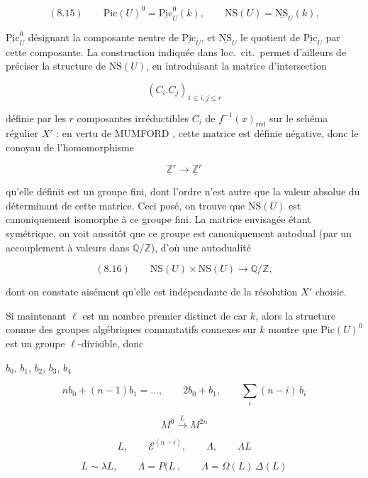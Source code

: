 \documentclass[11pt,a4paper]{article}
\begin{document}
\[ (8.15) \qquad \mathrm{Pic}(U)^{0} = \underline{\mathrm{Pic}}_{U}^{0}(k) , \qquad \mathrm{NS}(U) = \underline{\mathrm{NS}}_{U}(k) , \]

$\underline{\mathrm{Pic}}_{U}^{0}$ désignant la composante neutre de
$\underline{\mathrm{Pic}}_{U}$, et $\underline{\mathrm{NS}}_{U}$ le quotient de
$\underline{\mathrm{Pic}}_{U}$ par cette composante. La construction indiquée
dans loc.\ cit.\ permet d'ailleurs de préciser la structure de $\mathrm{NS}(U)$,
en introduisant la matrice d'intersection

\[ (C_{i} . C_{j})_{1 \leqslant i, j \leqslant r} \]

définie par les $r$ composantes irréductibles $C_{i}$ de $f^{-1}(x)_{\text{réd}}$
sur le schéma régulier $X'$ : en vertu de MUMFORD , cette matrice
est définie négative, donc le conoyau de l'homomorphisme

\[ \underline{\mathbb{Z}}^{r} \longrightarrow \underline{\mathbb{Z}}^{r} \]

qu'elle définit est un groupe fini, dont l'ordre n'est autre que la valeur
absolue du déterminant de cette matrice. Ceci posé, on trouve que
$\mathrm{NS}(U)$ est canoniquement isomorphe à ce groupe fini. La matrice
envisagée étant symétrique, on voit aussitôt que ce groupe est canoniquement
autodual (par un accouplement  à valeurs dans
$\mathbb{Q}/\mathbb{Z}$), d'où une autodualité 

\[ (8.16) \qquad \mathrm{NS}(U) \times \mathrm{NS}(U) \longrightarrow \mathbb{Q}/\mathbb{Z} , \]

dont on constate aisément qu'elle est indépendante de la résolution $X'$
choisie.

Si maintenant $\ell$ est un nombre premier distinct de car $k$, alors la
structure connue des groupes algébriques commutatifs connexes sur $k$
 montre que $\mathrm{Pic}(U)^{0}$ est un groupe
$\ell$-divisible, donc


\ill{} $b_{0}$, $b_{1}$, $b_{2}$, $b_{3}$, $b_{4}$

\[ n b_{0} + (n-1) b_{1} = \ldots , \qquad 2 b_{0} + b_{1} , \qquad \sum_{i} (n-i)\, b_{i} \]

\[ M^{0} \xrightarrow{\ L\ } M^{2n} \]

\[ L , \qquad \mathcal{E}^{(n-i)} , \qquad \Lambda , \qquad \Lambda L \]

\[ L \sim \lambda L , \qquad \Lambda = P(L \ , \qquad \Lambda = \Omega(L)\, \Delta(L) \]
\end{document}
